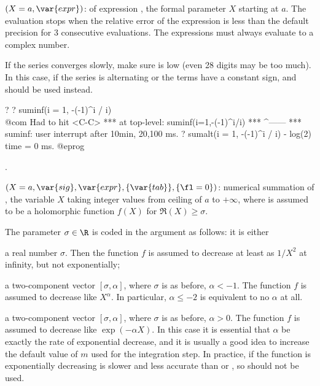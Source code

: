 $(X=a,\var{expr})$: \label{se:suminf} of expression
, the formal parameter $X$ starting at $a$. The evaluation stops
when the relative error of the expression is less than the default precision
for 3 consecutive evaluations. The expressions must always evaluate to a
complex number.

If the series converges slowly, make sure  is low (even 28
digits may be too much). In this case, if the series is alternating or the
terms have a constant sign,  and  should be used
instead.

\bprog
? 
? suminf(i = 1, -(-1)^i / i)   \\@com Had to hit <C-C>
  ***   at top-level: suminf(i=1,-(-1)^i/i)
  ***                                ^------
  *** suminf: user interrupt after 10min, 20,100 ms.
? sumalt(i = 1, -(-1)^i / i) - log(2)
time = 0 ms.
@eprog

.

$(X=a,\var{sig},\var{expr},\{\var{tab}\},\{\fl=0\})$: \label{se:sumnum}numerical summation of , the variable $X$ taking integer values
from ceiling of $a$ to $+\infty$, where  is assumed to be a
holomorphic function $f(X)$ for $\Re(X)\ge \sigma$.

The parameter $\sigma\in\R$ is coded in the argument  as follows: it
is either

\item a real number $\sigma$. Then the function $f$ is assumed to
decrease at least as $1/X^2$ at infinity, but not exponentially;

\item a two-component vector $[\sigma,\alpha]$, where $\sigma$ is as
before, $\alpha < -1$. The function $f$ is assumed to decrease like
$X^{\alpha}$. In particular, $\alpha\le-2$ is equivalent to no $\alpha$ at all.

\item a two-component vector $[\sigma,\alpha]$, where $\sigma$ is as
before, $\alpha > 0$. The function $f$ is assumed to decrease like
$\exp(-\alpha X)$. In this case it is essential that $\alpha$ be exactly the
rate of exponential decrease, and it is usually a good idea to increase
the default value of $m$ used for the integration step. In practice, if
the function is exponentially decreasing  is slower and less
accurate than  or , so should not be used.

